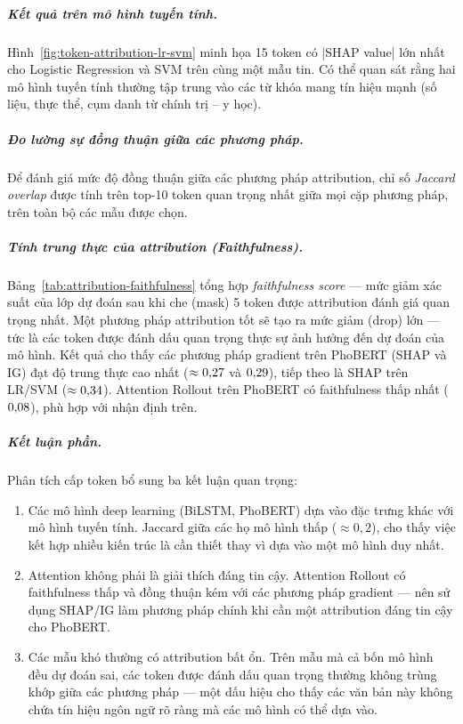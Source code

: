 \subparagraph*{Kết quả trên mô hình tuyến tính.}
Hình~\ref{fig:token-attribution-lr-svm} minh họa 15 token có |SHAP value| lớn nhất cho Logistic Regression và SVM trên cùng một mẫu tin. Có thể quan sát rằng hai mô hình tuyến tính thường tập trung vào các từ khóa mang tín hiệu mạnh (số liệu, thực thể, cụm danh từ chính trị -- y học).

\subparagraph*{Đo lường sự đồng thuận giữa các phương pháp.} \;Để đánh giá mức độ đồng thuận giữa các phương pháp attribution, chỉ số \textit{Jaccard overlap} được tính trên top-10 token quan trọng nhất giữa mọi cặp phương pháp, trên toàn bộ các mẫu được chọn.

\subparagraph*{Tính trung thực của attribution (Faithfulness).}
Bảng~\ref{tab:attribution-faithfulness} tổng hợp \textit{faithfulness score} --- mức giảm xác suất của lớp dự đoán sau khi che (mask) 5 token được attribution đánh giá quan trọng nhất. Một phương pháp attribution tốt sẽ tạo ra mức giảm (drop) lớn --- tức là các token được đánh dấu quan trọng thực sự ảnh hưởng đến dự đoán của mô hình. Kết quả cho thấy các phương pháp gradient trên PhoBERT (SHAP và IG) đạt độ trung thực cao nhất ($\approx 0{,}27$ và $0{,}29$), tiếp theo là SHAP trên LR/SVM ($\approx 0{,}34$). Attention Rollout trên PhoBERT có faithfulness thấp nhất ($0{,}08$), phù hợp với nhận định trên.

\subparagraph*{Kết luận phần.} \;
Phân tích cấp token bổ sung ba kết luận quan trọng:
\begin{enumerate}[leftmargin=2em]
  \item Các mô hình deep learning (BiLSTM, PhoBERT) dựa vào đặc trưng khác với mô hình tuyến tính. Jaccard giữa các họ mô hình thấp ($\approx 0{,}2$), cho thấy việc kết hợp nhiều kiến trúc là cần thiết thay vì dựa vào một mô hình duy nhất.
  \item Attention không phải là giải thích đáng tin cậy. Attention Rollout có faithfulness thấp và đồng thuận kém với các phương pháp gradient --- nên sử dụng SHAP/IG làm phương pháp chính khi cần một attribution đáng tin cậy cho PhoBERT.
  \item Các mẫu khó thường có attribution bất ổn. Trên \nhardexamples{} mẫu mà cả bốn mô hình đều dự đoán sai, các token được đánh dấu quan trọng thường không trùng khớp giữa các phương pháp --- một dấu hiệu cho thấy các văn bản này không chứa tín hiệu ngôn ngữ rõ ràng mà các mô hình có thể dựa vào.
\end{enumerate}

